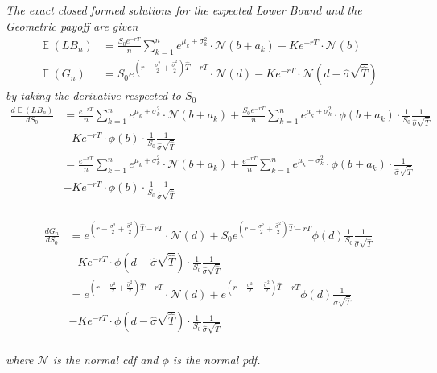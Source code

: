 \documentclass[10pt,oneside,a4paper]{article}
\DeclareMathOperator{\E}{\mathbb{E}}
\begin{document}
\begin{flushleft}
\subsection{}
\textsl{The exact closed formed solutions for the expected Lower Bound and the Geometric payoff are given}
\begin{align*}
\E\left(LB_n\right) &= \frac{S_0 e^{-rT}}{n}\sum_{k=1}^{n} e^{\mu_k + \sigma_k^2} \cdot \mathcal{N}\left(b+a_k\right)  - K e^{-rT} \cdot \mathcal{N}\left(b \right)\\
\E\left(G_n\right) &= S_0 e^{\left(r - \frac{\sigma^2}{2} + \frac{\hat{\sigma}^2}{2}\right)\hat{T} - rT} \cdot \mathcal{N}\left(d\right) - K e^{-rT} \cdot \mathcal{N}\left(d - \hat{\sigma}\sqrt{\hat{T}}\right)
\end{align*}
\textsl{by taking the derivative respected to $S_0$}
\begin{align*}
\frac{d \E\left(LB_n\right)}{dS_0} &= \frac{e^{-rT}}{n}\sum_{k=1}^{n} e^{\mu_k + \sigma_k^2} \cdot \mathcal{N}\left(b+a_k\right) + \frac{S_0 e^{-rT}}{n}\sum_{k=1}^{n}e^{\mu_k + \sigma_k^2} \cdot \phi\left(b+a_k\right) \cdot \frac{1}{S_0}\frac{1}{\hat{\sigma}\sqrt{\hat{T}}}\\
& - K e^{-rT} \cdot \phi\left(b \right) \cdot \frac{1}{S_0}\frac{1}{\hat{\sigma}\sqrt{\hat{T}}}\\
 &= \frac{e^{-rT}}{n}\sum_{k=1}^{n} e^{\mu_k + \sigma_k^2} \cdot \mathcal{N}\left(b+a_k\right) + \frac{e^{-rT}}{n}\sum_{k=1}^{n}e^{\mu_k + \sigma_k^2} \cdot \phi\left(b+a_k\right) \cdot \frac{1}{\hat{\sigma}\sqrt{\hat{T}}}\\
& - K e^{-rT} \cdot \phi\left(b \right) \cdot \frac{1}{S_0}\frac{1}{\hat{\sigma}\sqrt{\hat{T}}}\\
\end{align*} 

\vspace{5mm}
\begin{align*}
\frac{d G_n}{dS_0} &= e^{\left(r - \frac{\sigma^2}{2} + \frac{\hat{\sigma}^2}{2}\right)\hat{T} - rT} \cdot \mathcal{N}\left(d\right) + S_0 e^{\left(r - \frac{\sigma^2}{2} + \frac{\hat{\sigma}^2}{2}\right)\hat{T} - rT} \phi \left(d\right) \frac{1}{S_0} \frac{1}{\hat{\sigma}\sqrt{\hat{T}}}\\
& - K e^{-rT} \cdot \phi\left(d - \hat{\sigma}\sqrt{\hat{T}}\right) \cdot \frac{1}{S_0}\frac{1}{\hat{\sigma}\sqrt{\hat{T}}}\\
&= e^{\left(r - \frac{\sigma^2}{2} + \frac{\hat{\sigma}^2}{2}\right)\hat{T} - rT} \cdot \mathcal{N}\left(d\right) +e^{\left(r - \frac{\sigma^2}{2} + \frac{\hat{\sigma}^2}{2}\right)\hat{T} - rT} \phi \left(d\right) \frac{1}{\hat{\sigma}\sqrt{\hat{T}}}\\
& - K e^{-rT} \cdot \phi\left(d - \hat{\sigma}\sqrt{\hat{T}}\right) \cdot \frac{1}{S_0}\frac{1}{\hat{\sigma}\sqrt{\hat{T}}}\\
\end{align*}

\textsl{where $\mathcal{N}$ is the normal cdf and $\phi$ is the normal pdf.}


\end{flushleft}
\end{document}
